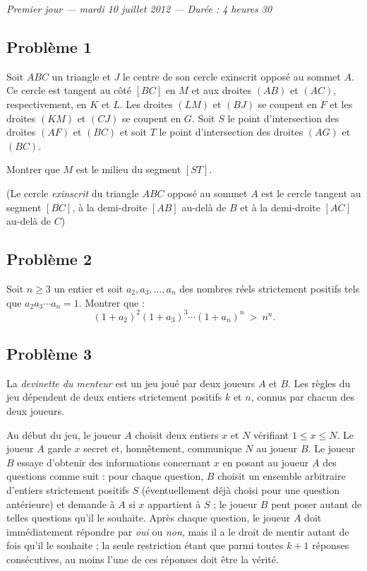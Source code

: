 
\begin{center}
  \emph{Premier jour --- mardi 10 juillet 2012 --- Durée : 4 heures 30}
\end{center}

\subsection*{Problème 1}
Soit $ABC$ un triangle et $J$ le centre de son cercle exinscrit opposé au sommet $A$. Ce cercle est tangent au
côté $[BC]$ en $M$ et aux droites $(AB)$ et $(AC)$, respectivement, en $K$ et $L$. Les droites $(LM)$ et
$(BJ)$ se coupent en $F$ et les droites $(KM)$ et $(CJ)$ se coupent en $G$. Soit $S$ le point d'intersection
des droites $(AF)$ et $(BC)$ et soit $T$ le point d'intersection des droites $(AG)$ et $(BC)$.

Montrer que $M$ est le milieu du segment $[ST]$.

(Le cercle \emph{exinscrit} du triangle $ABC$ opposé au sommet $A$ est le cercle tangent au segment $[BC]$, à
la demi-droite $[AB]$ au-delà de $B$ et à la demi-droite $[AC]$ au-delà de $C$)

\subsection*{Problème 2}
Soit $n \geq 3$ un entier et soit $a_2, a_3, \ldots, a_n$ des nombres réels strictement positifs tels que
$a_2a_3\cdots a_n = 1$. Montrer que :
\[
(1 + a_2)^2(1 + a_3)^3\cdots(1 + a_n)^n \ > \ n^n.
\]

\subsection*{Problème 3}
La \emph{devinette du menteur} est un jeu joué par deux joueurs $A$ et $B$. Les règles du jeu dépendent de
deux entiers strictement positifs $k$ et $n$, connus par chacun des deux joueurs.

Au début du jeu, le joueur $A$ choisit deux entiers $x$ et $N$ vérifiant $1 \leq x \leq N$. Le joueur $A$
garde $x$ secret et, honnêtement, communique $N$ au joueur $B$. Le joueur $B$ essaye d'obtenir des
informations concernant $x$ en posant au joueur $A$ des questions comme suit : pour chaque question, $B$
choisit un ensemble arbitraire d'entiers strictement positifs $S$ (éventuellement déjà choisi pour une
question antérieure) et demande à $A$ si $x$ appartient à $S$ ; le joueur $B$ peut poser autant de telles
questions qu'il le souhaite. Après chaque question, le joueur $A$ doit immédiatement répondre par \emph{oui}
ou \emph{non}, mais il a le droit de mentir autant de fois qu'il le souhaite ; la seule restriction étant que
parmi toutes $k + 1$ réponses consécutives, au moins l'une de ces réponses doit être la vérité.

